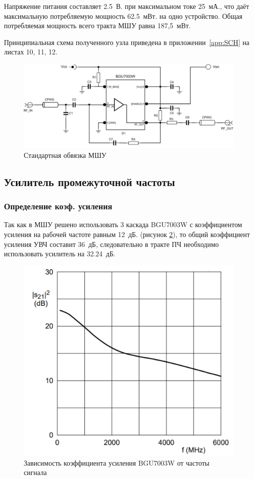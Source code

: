 \documentclass[utf8x, 14pt, oneside, a4paper]{article}
\begin{document}
				Напряжение питания составляет 2.5~В. при максимальном токе 25~мА., что даёт максимальную потребляемую мощность 62.5~мВт. на одно устройство. Общая потребляемая мощность всего тракта МШУ равна 187,5~мВт.
				
				Принципиальная схема полученного узла приведена в приложении~\ref{app:SCH} на листах 10, 11, 12.
				\begin{figure}[h!]
					\centering
					\includegraphics[width=0.7\linewidth]{"Обвязка МШУ"}
					\caption{Стандартная обвязка МШУ}
					\label{fig:обвязка:МШУ}
				\end{figure}
			
		\subsection{Усилитель промежуточной частоты}
			\subsubsection{Определение коэф. усиления}
				Так как в МШУ решено использовать 3 каскада BGU7003W с коэффициентом усиления на рабочей частоте равным 12~дБ. (рисунок \ref{fig:усиление:МШУ}), то общий коэффициент усиления УВЧ составит 36~дБ, следовательно в тракте ПЧ необходимо использовать усилитель на 32.24~дБ.
				\begin{figure}[h!]
					\centering
					\includegraphics[width=0.7\linewidth]{"МШУ усиление"}
					\caption{Зависимость коэффициента усиления BGU7003W от частоты сигнала}
					\label{fig:усиление:МШУ}
				\end{figure}
\end{document}
